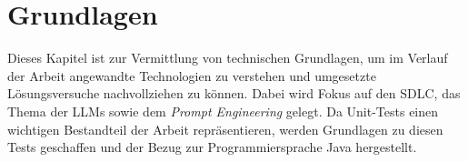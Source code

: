 
\chapter{Grundlagen}
Dieses Kapitel ist zur Vermittlung von technischen Grundlagen, um im Verlauf der Arbeit angewandte Technologien zu verstehen und umgesetzte Lösungsversuche nachvollziehen zu können. Dabei wird Fokus auf den SDLC, das Thema der LLMs sowie dem \textit{Prompt Engineering} gelegt. Da Unit-Tests einen wichtigen Bestandteil der Arbeit repräsentieren, werden Grundlagen zu diesen Tests geschaffen und der Bezug zur Programmiersprache Java hergestellt.

